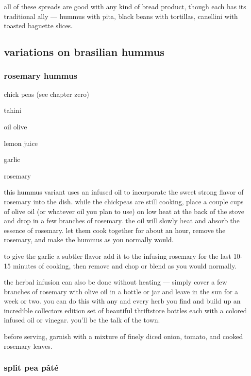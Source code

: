 all of these spreads are good with any kind of bread product, though
each has its traditional ally --- hummus with pita, black beans with
tortillas, canellini with toasted baguette slices.

\subsection{variations on brasilian hummus}

\subsubsection{rosemary hummus}

\begin{ingredients}
  \item chick peas (see chapter zero)
  \item tahini
  \item oil olive
  \item lemon juice
  \item garlic
  \item rosemary
\end{ingredients}

this hummus variant uses an infused oil to incorporate the sweet
strong flavor of rosemary into the dish. while the chickpeas are still
cooking, place a couple cups of olive oil (or whatever oil you plan to
use) on low heat at the back of the stove and drop in a few branches
of rosemary. the oil will slowly heat and absorb the essence of
rosemary. let them cook together for about an hour, remove the
rosemary, and make the hummus as you normally would.

to give the garlic a subtler flavor add it to the infusing rosemary
for the last 10-15 minutes of cooking, then remove and chop or blend
as you would normally.

the herbal infusion can also be done without heating --- simply cover
a few branches of rosemary with olive oil in a bottle or jar and leave
in the sun for a week or two. you can do this with any and every herb
you find and build up an incredible collectors edition set of
beautiful thriftstore bottles each with a colored infused oil or
vinegar. you'll be the talk of the town.

before serving, garnish with a mixture of finely diced onion, tomato,
and cooked rosemary leaves.

\subsubsection{split pea p\^{a}t\'{e}}

